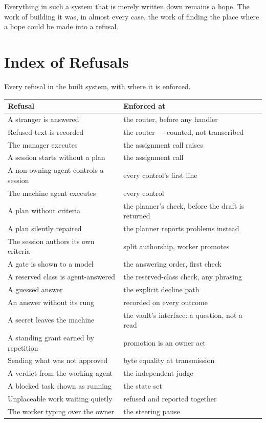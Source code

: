 \documentclass[11pt]{article}
\begin{document}
Everything in such a system that is merely written down remains a hope. The work of building it was, in almost every case, the work of finding the place where a hope could be made into a refusal.

\appendix

\section{Index of Refusals}
\label{app:refusals}

Every refusal in the built system, with where it is enforced.

\begin{longtable}{@{}L{5.0cm}L{8.4cm}@{}}
\toprule
\textbf{Refusal} & \textbf{Enforced at} \\
\midrule
\endhead
A stranger is answered & the router, before any handler \\
Refused text is recorded & the router --- counted, not transcribed \\
The manager executes & the assignment call raises \\
A session starts without a plan & the assignment call \\
A non-owning agent controls a session & every control's first line \\
The machine agent executes & every control \\
A plan without criteria & the planner's check, before the draft is returned \\
A plan silently repaired & the planner reports problems instead \\
The session authors its own criteria & split authorship, worker promotes \\
A gate is shown to a model & the answering order, first check \\
A reserved class is agent-answered & the reserved-class check, any phrasing \\
A guessed answer & the explicit decline path \\
An answer without its rung & recorded on every outcome \\
A secret leaves the machine & the vault's interface: a question, not a read \\
A standing grant earned by repetition & promotion is an owner act \\
Sending what was not approved & byte equality at transmission \\
A verdict from the working agent & the independent judge \\
A blocked task shown as running & the state set \\
Unplaceable work waiting quietly & refused and reported together \\
The worker typing over the owner & the steering pause \\
\bottomrule
\end{longtable}
\end{document}
